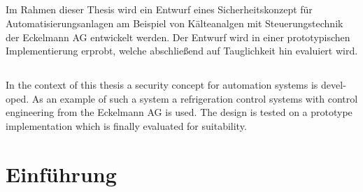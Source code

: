 \documentclass[11pt,a4paper]{report}
\begin{document}

\vfill
\section*{\center\abstractname{}}

Im Rahmen dieser Thesis wird ein Entwurf eines Sicherheitskonzept für Automatisierungsanlagen am Beispiel von Kälteanalgen mit Steuerungstechnik der Eckelmann AG entwickelt werden. Der Entwurf wird in einer prototypischen Implementierung erprobt, welche abschließend auf Tauglichkeit hin evaluiert wird.

\vfill

\begin{otherlanguage}{english} 
\section*{\center\abstractname{}}

In the context of this thesis a security concept for automation systems is developed. As an example of such a system a refrigeration control systems with control engineering from the Eckelmann AG is used. The design is tested on a prototype implementation which is finally evaluated for suitability.

\end{otherlanguage}
\vfill

\tableofcontents
\clearpage 


\chapter{Einführung} \label{chap:intro}
\end{document}
